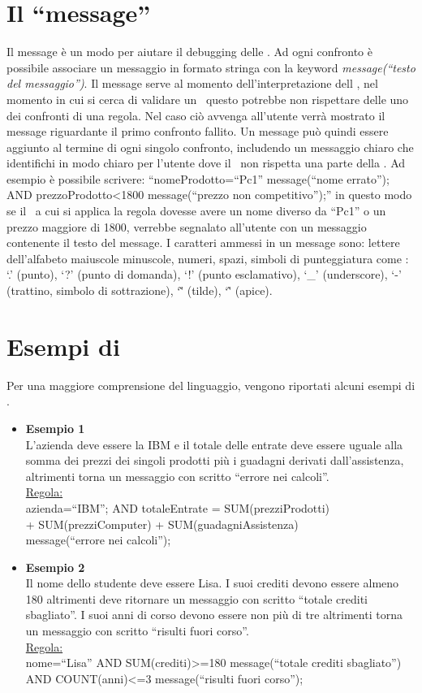 \section{Il ``message''}
Il message \`e un modo per aiutare il debugging delle \br. Ad ogni confronto \`e possibile associare un messaggio in formato stringa con la keyword \textit{message(``testo del messaggio'')}. Il message serve al momento dell'interpretazione dell \br, nel momento in cui si cerca di validare un \bo\ questo potrebbe non rispettare delle uno dei confronti di una regola. Nel caso ci\`o avvenga all'utente verr\`a mostrato il message riguardante il primo confronto fallito. Un message pu\`o quindi essere aggiunto al termine di ogni singolo confronto, includendo un messaggio chiaro che identifichi in modo chiaro per l'utente dove il \bo\ non rispetta una parte della \br. Ad esempio \`e possibile scrivere: ``nomeProdotto=``Pc1'' message(``nome errato''); AND prezzoProdotto\textless1800 message(``prezzo non competitivo'');'' in questo modo se il \bo\ a cui si applica la regola dovesse avere un nome diverso da ``Pc1'' o un prezzo maggiore di 1800, verrebbe segnalato all'utente con un messaggio contenente il testo del message. I caratteri ammessi in un message sono: lettere dell'alfabeto maiuscole minuscole, numeri, spazi, simboli di punteggiatura come : `.' (punto),  `?' (punto di domanda),  `!' (punto esclamativo),  `\_' (underscore),  `-' (trattino, simbolo di sottrazione),  `\~' (tilde), `\^' (apice).


\section{Esempi di \br}
Per una maggiore comprensione del linguaggio, vengono riportati alcuni esempi di \br.
\begin{itemize}
\item \textbf{Esempio 1} \\
L'azienda deve essere la IBM e il totale delle entrate deve essere uguale alla somma dei prezzi dei singoli prodotti pi\`u i guadagni derivati dall'assistenza, altrimenti torna un messaggio con scritto ``errore nei calcoli''. \\
\underline{Regola:} \\
azienda=``IBM''; AND totaleEntrate = SUM(prezziProdotti)\\
 + SUM(prezziComputer) + SUM(guadagniAssistenza)\\
 message(``errore nei calcoli'');
\item \textbf{Esempio 2} \\
Il nome dello studente deve essere Lisa. I suoi crediti devono essere almeno 180 altrimenti deve ritornare un messaggio con scritto ``totale crediti sbagliato''. I suoi anni di corso devono essere non pi\`u di tre altrimenti torna un messaggio con scritto ``risulti fuori corso''.  \\
\underline{Regola:} \\
nome=``Lisa'' AND SUM(crediti)\textgreater =180 message(``totale crediti sbagliato'') AND COUNT(anni)\textless =3 message(``risulti fuori corso'');
\end{itemize}

